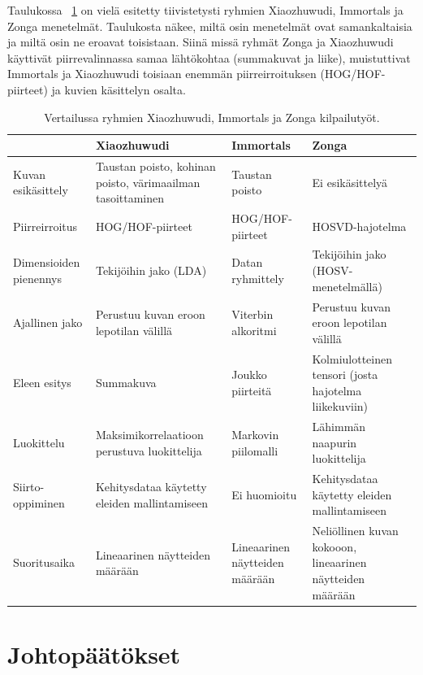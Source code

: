 Taulukossa ~\ref{table:kolmetyötä} on vielä esitetty tiivistetysti ryhmien Xiaozhuwudi, Immortals ja Zonga menetelmät.
Taulukosta näkee, miltä osin menetelmät ovat samankaltaisia ja miltä osin ne eroavat toisistaan. Siinä missä ryhmät
Zonga ja Xiaozhuwudi käyttivät piirrevalinnassa samaa lähtökohtaa (summakuvat ja liike), muistuttivat Immortals ja Xiaozhuwudi
toisiaan enemmän piirreirroituksen (HOG/HOF-piirteet) ja kuvien käsittelyn osalta. \\

\begin{table}[th]
\caption{Vertailussa ryhmien Xiaozhuwudi, Immortals ja Zonga kilpailutyöt. \citep{firstround}}
\label{table:kolmetyötä}
\begin{center}
\begin{tabular}{|p{}|p{}|p{}|p{}|} 
    \hline
 & Xiaozhuwudi & Immortals & Zonga\\
    \hline
    \hline
 Kuvan esikäsittely & Taustan poisto, kohinan poisto, värimaailman tasoittaminen& Taustan poisto & Ei esikäsittelyä\\
    \hline
 Piirreirroitus & HOG/HOF-piirteet & HOG/HOF-piirteet & HOSVD-hajotelma \\
    \hline
 Dimensioiden pienennys & Tekijöihin jako (LDA)& Datan ryhmittely & Tekijöihin jako (HOSV-menetelmällä)\\
    \hline	
 Ajallinen jako &Perustuu kuvan eroon lepotilan välillä &Viterbin alkoritmi &Perustuu kuvan eroon lepotilan välillä\\
     \hline
 Eleen esitys &Summakuva &Joukko piirteitä &Kolmiulotteinen tensori (josta hajotelma liikekuviin)\\
     \hline
 Luokittelu &Maksimikorrelaatioon perustuva luokittelija &Markovin piilomalli &Lähimmän naapurin luokittelija\\
      \hline
 Siirto-oppiminen &Kehitysdataa käytetty eleiden mallintamiseen&Ei huomioitu&Kehitysdataa käytetty eleiden mallintamiseen\\
      \hline
 Suoritusaika &Lineaarinen näytteiden määrään&Lineaarinen näytteiden määrään &Neliöllinen kuvan kokooon, lineaarinen näytteiden määrään\\
      \hline
	  \hline
\end{tabular}
\end{center}
\end{table}
\newpage
\section {Johtopäätökset}

